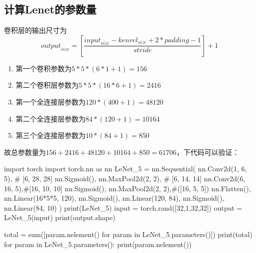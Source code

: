 \documentclass[12pt, a4paper, oneside]{ctexart}
\begin{document}
\subsection{计算Lenet的参数量}
卷积层的输出尺寸为$${output}_{size}=[\frac{{input}_{size}-{kenrel}_{size}+2*padding-1}{stride}]+1$$
\begin{enumerate}
    \item  第一个卷积参数为$5*5*(6*1+1)=156$
    \item  第二个卷积层参数为$5*5*(16*6+1)=2416$
    \item  第一个全连接层参数为$120*(400+1)=48120$
    \item  第二个全连接层参数为$84*(120+1)=10164$
    \item  第三个全连接层参数为$10*(84+1)=850$
\end{enumerate}
故总参数量为$156+2416+48120+10164+850=61706$，下代码可以验证：
\begin{python}
    import torch
    import torch.nn as nn
    LeNet_5 = nn.Sequential(
                nn.Conv2d(1, 6, 5), #  [6, 28, 28]
                nn.Sigmoid(),
                nn.MaxPool2d(2, 2), # [6, 14, 14]
                nn.Conv2d(6, 16, 5),#[16, 10, 10]
                nn.Sigmoid(),
                nn.MaxPool2d(2, 2),#([16, 5, 5])
                nn.Flatten(),
                nn.Linear(16*5*5, 120),
                nn.Sigmoid(),
                nn.Linear(120, 84),
                nn.Sigmoid(),
                nn.Linear(84, 10)
            )
    print(LeNet_5)
    input = torch.rand([32,1,32,32])
    output = LeNet_5(input)
    print(output.shape)
    
    total = sum([param.nelement() for 
                    param in LeNet_5.parameters()])
    print(total)
    for param in LeNet_5.parameters():
        print(param.nelement())
\end{python}
\end{document}
